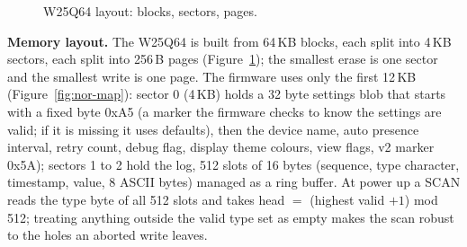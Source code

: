 \documentclass[a4paper,10pt]{article}
\begin{document}
\begin{figure}[H]
\centering
{}
\caption{W25Q64 layout: blocks, sectors, pages.}
\label{fig:nor-chip}
\end{figure}

\textbf{Memory layout.} The W25Q64 is built from 64\,KB blocks, each split into 4\,KB
sectors, each split into 256\,B pages (Figure~\ref{fig:nor-chip}); the smallest erase is one
sector and the smallest write is one page. The firmware uses only the first 12\,KB
(Figure~\ref{fig:nor-map}): sector 0 (4\,KB) holds a 32 byte settings
blob that starts with a fixed byte 0xA5 (a marker the firmware checks to know the
settings are valid; if it is missing it uses defaults), then the device name, auto presence
interval, retry count, debug
flag, display theme colours, view flags, v2 marker 0x5A); sectors 1 to 2 hold the
log, 512 slots of 16 bytes (sequence, type character, timestamp, value, 8 ASCII
bytes) managed as a ring buffer. At power up a SCAN reads the type byte of all 512
slots and takes head $=$ (highest valid $+1$) mod 512; treating anything outside the
valid type set as empty makes the scan robust to the holes an aborted write leaves.
\end{document}
